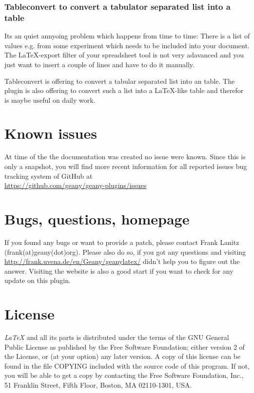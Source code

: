 \documentclass[%
paper=a4,%
fontsize=11pt,%
twoside=false,%
DIV18,%
headsepline,%
plainheadsepline,%
footsepline,%
plainfootsepline,%
bibliography=totoc,%
listof=totoc,%
BCOR10mm,%
parskip=half,%
openany,%
]{scrreprt}
\begin{document}
\subsection{Tableconvert to convert a tabulator separated list into a table}

Its an quiet annyoing problem which happens from time to time: There
is a list of values e.g. from some experiment which needs to be
included into your document. The \LaTeX{}-export filter of your
spreadsheet tool is not very adavanced and you just want to insert a
couple of lines and have to do it manually.

Tableconvert is offering to convert a tabular separated list into an
table. The plugin is also offering to convert such a list into a
\LaTeX{}-like table and therefor is maybe useful on daily work.

\chapter{Known issues}
At time of the the documentation was created no issue were known.
Since this is only a snapshot, you will find more recent information
for all reported issues bug tracking system of GitHub at \\
\url{https://github.com/geany/geany-plugins/issues}

\chapter{Bugs, questions, homepage}
\label{contact}
If you found any bugs or want to provide a patch, please contact Frank
Lanitz (frank(at)geany(dot)org). Please also do so, if you got any
questions and visiting \\ \url{http://frank.uvena.de/en/Geany/geanylatex/}
didn't help you to figure out the answer. Visiting the website is also
a good start if you want to check for any update on this plugin.

\chapter{License}
\textit{LaTeX} and all its parts is distributed under the terms of the
GNU General Public License as published by the Free Software
Foundation; either version 2 of the License, or (at your option) any
later version. A copy of this license can be found in the file COPYING
included with the source code of this program. If not, you will be
able to get a copy by contacting the Free Software Foundation, Inc.,
51 Franklin Street, Fifth Floor, Boston, MA 02110-1301, USA.
\end{document}
